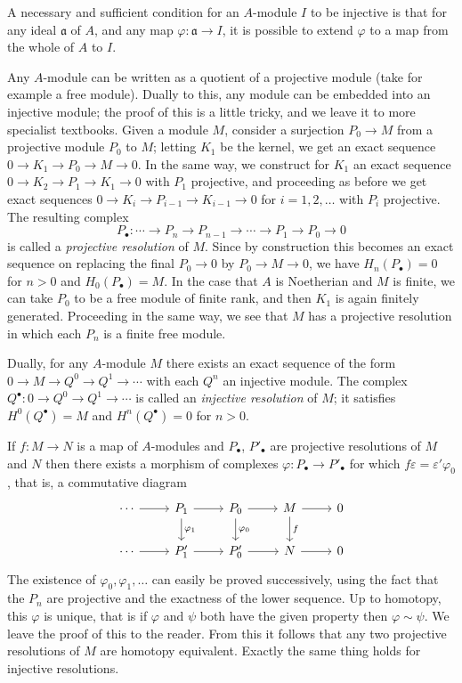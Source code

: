 \begin{theorem}\label{thm:B3}
A necessary and sufficient condition for an $A$-module $I$ to be injective is that
for any ideal $\mathfrak{a}$ of $A$, and any map $\varphi\colon \mathfrak{a} \to I$, it is possible to extend
$\varphi$ to a map from the whole of $A$ to $I$.
\end{theorem}

Any $A$-module can be written as a quotient of a projective module (take for
example a free module). Dually to this, any module can be embedded into an
injective module; the proof of this is a little tricky, and we leave it to more
specialist textbooks. Given a module $M$, consider a surjection
$P_0 \to M$ from a projective module $P_0$ to $M$; letting $K_1$ be the kernel, we get an
exact sequence $0 \to K_1 \to P_0 \to M \to 0$. In the same way, we construct for $K_1$
an exact sequence $0 \to K_2 \to P_1 \to K_1 \to 0$ with $P_1$ projective, and proceeding as
before we get exact sequences $0 \to K_i \to P_{i-1} \to K_{i-1} \to 0$ for $i = 1, 2, \ldots$ with
$P_i$ projective. The resulting complex
\[
  P_\bullet\colon \cdots \to P_n \to P_{n-1} \to \cdots \to P_1 \to P_0 \to 0
\]
is called a \emph{projective resolution} of $M$. Since by construction this becomes an exact
sequence on replacing the final $P_0 \to 0$ by $P_0 \to M \to 0$, we have $H_n(P_\bullet) = 0$
for $n > 0$ and $H_0(P_\bullet) = M$. In the case that $A$ is Noetherian and $M$ is finite,
we can take $P_0$ to be a free module of finite rank, and then $K_1$ is again
finitely generated. Proceeding in the same way, we see that $M$ has a projective
resolution in which each $P_n$ is a finite free module.

Dually, for any $A$-module $M$ there exists an exact sequence of the form
$0 \to M \to Q^0 \to Q^1 \to \cdots$ with each $Q^n$ an injective module. The complex
$Q^\bullet\colon 0 \to Q^0 \to Q^1 \to \cdots$ is called an \emph{injective resolution} of $M$; it
satisfies $H^0(Q^\bullet) = M$ and $H^n(Q^\bullet) = 0$ for $n > 0$.

If $f\colon M \to N$ is a map of $A$-modules and $P_\bullet$, $P'_\bullet$ are projective
resolutions of $M$ and $N$ then there exists a morphism of complexes
$\varphi\colon P_\bullet \to P'_\bullet$ for which $f\varepsilon = \varepsilon'\varphi_0$, that is, a commutative diagram
\[
\begin{tikzcd}
\cdots \arrow[r] & P_1 \arrow[r] \arrow[d, "\varphi_1"] & P_0 \arrow[r] \arrow[d, "\varphi_0"] & M \arrow[r] \arrow[d, "f"] & 0 \\
\cdots \arrow[r] & P'_1 \arrow[r] & P'_0 \arrow[r] & N \arrow[r] & 0
\end{tikzcd}
\]
The existence of $\varphi_0, \varphi_1, \ldots$ can easily be proved successively, using the fact
that the $P_n$ are projective and the exactness of the lower sequence. Up to
homotopy, this $\varphi$ is unique, that is if $\varphi$ and $\psi$ both have the given property
then $\varphi \sim \psi$. We leave the proof of this to the reader. From this it follows
that any two projective resolutions of $M$ are homotopy equivalent. Exactly the
same thing holds for injective resolutions.

